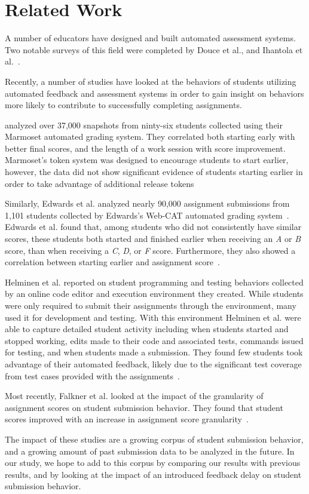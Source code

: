 \section{Related Work}

A number of educators have designed and built automated assessment systems. Two
notable surveys of this field were completed by Douce et al., and Ihantola et
al.~\cite{Douce:2005:ATA:1163405.1163409, Ihantola:2010:RRS:1930464.1930480}.

Recently, a number of studies have looked at the behaviors of students
utilizing automated feedback and assessment systems in order to gain insight on
behaviors more likely to contribute to successfully completing assignments.

\spacco{} analyzed over 37,000 snapshots from ninty-six students collected
using their Marmoset automated grading system. They correlated both starting
early with better final scores, and the length of a work session with score
improvement. Marmoset's token system was designed to encourage students to
start earlier, however, the data did not show significant evidence of students
starting earlier in order to take advantage of additional release
tokens~\cite{Spacco:2013:TIP:2462476.2465594, Spacco:2006:EMD:1140124.1140131}

Similarly, Edwards et al. analyzed nearly 90,000 assignment submissions from
1,101 students collected by Edwards's Web-CAT automated grading
system~\cite{Edwards:2003:RCS:949344.949390}. Edwards et al. found that, among
students who did not consistently have similar scores, these students both
started and finished earlier when receiving an \emph{A} or \emph{B} score, than
when receiving a \emph{C}, \emph{D}, or \emph{F} score. Furthermore, they also
showed a correlation between starting earlier and assignment
score~\cite{Edwards:2009:CEI:1584322.1584325}.

Helminen et al. reported on student programming and testing behaviors collected
by an online code editor and execution environment they created. While students
were only required to submit their assignments through the environment, many
used it for development and testing. With this environment Helminen et al. were
able to capture detailed student activity including when students started and
stopped working, edits made to their code and associated tests, commands issued
for testing, and when students made a submission.  They found few students took
advantage of their automated feedback, likely due to the significant test
coverage from test cases provided with the
assignments~\cite{Helminen:2013:RAI:2526968.2526970}.

Most recently, Falkner et al. looked at the impact of the granularity of
assignment scores on student submission behavior. They found that student
scores improved with an increase in assignment score
granularity~\cite{Falkner:2014:IEA:2538862.2538896}.

The impact of these studies are a growing corpus of student submission
behavior, and a growing amount of past submission data to be analyzed in the
future. In our study, we hope to add to this corpus by comparing our results
with previous results, and by looking at the impact of an introduced feedback
delay on student submission behavior.

